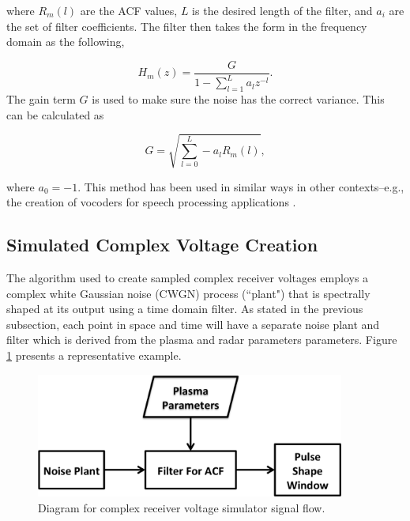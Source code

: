 \documentclass[draft,ras]{agutex}
\begin{document}
\begin{article}
\noindent where $R_m(l)$ are the ACF values, $L$ is the desired length of the filter, and $ a_i$ are the set of filter coefficients. The filter then takes the form in the frequency domain as the following,

\begin{equation}
\label{eq:filtz}
H_m(z) = \frac{G}{1-\displaystyle \sum_{l=1}^{L} a_l z^{-l}}.
\end{equation}
\noindent The gain term $G$ is used to make sure the noise has the correct variance. This can be calculated as 

\begin{equation}
\label{eq:gainterm}
G=\sqrt{\displaystyle \sum_{l=0}^L -a_l R_m(l)},
\end{equation}

\noindent where $a_0=-1$.  This method has been used in similar ways in other contexts--e.g., the creation of vocoders for speech processing applications \citep{rabinerdigitalspeech}.

\subsection{Simulated Complex Voltage Creation}

The algorithm used to create sampled complex receiver voltages employs a complex white Gaussian noise (CWGN) process (``plant") that is spectrally shaped at its output using a time domain filter. As stated in the previous subsection, each point in space and time will have a separate noise plant and filter which is derived from the plasma and radar parameters parameters.  Figure \ref{fig:IQdiagram} presents a representative example. 

\begin{figure}[h!]
\centering
\includegraphics[width=4in]{diagrampart}
\caption{Diagram for complex receiver voltage simulator signal flow.}
\label{fig:IQdiagram}
\end{figure}


\end{article}
\end{document}
